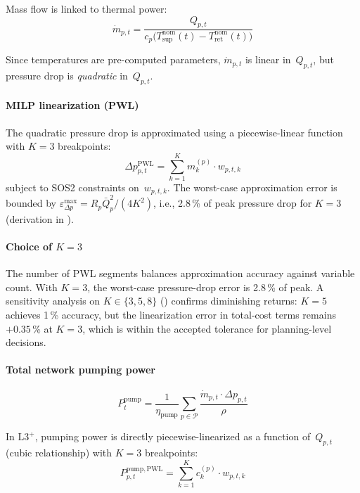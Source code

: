 \documentclass[review,3p]{elsarticle}
\newcommand{\Lplus}{\mathrm{L3}^{+}}
\begin{document}
Mass flow is linked to thermal power:
\begin{equation}
  \dot{m}_{p,t} = \frac{Q_{p,t}}{c_p \bigl(
    T_{\mathrm{sup}}^{\mathrm{nom}}(t)
    - T_{\mathrm{ret}}^{\mathrm{nom}}(t)\bigr)}
  \label{eq:massflow}
\end{equation}

Since temperatures are pre-computed parameters, $\dot{m}_{p,t}$ is
linear in~$Q_{p,t}$, but pressure drop is \emph{quadratic}
in~$Q_{p,t}$.

\paragraph{MILP linearization (PWL)}
The quadratic pressure drop is approximated using a piecewise-linear
function with $K=3$ breakpoints:
\begin{equation}
  \Delta p_{p,t}^{\mathrm{PWL}} = \sum_{k=1}^{K}
    m_k^{(p)} \cdot w_{p,t,k}
  \label{eq:pressure_pwl}
\end{equation}
subject to SOS2 constraints on~$w_{p,t,k}$. The worst-case
approximation error is bounded by
$\varepsilon_{\Delta p}^{\max} = R_p \bar{Q}_p^2 / (4K^2)$, i.e.,
2.8\,\% of peak pressure drop for $K=3$ (derivation in
).

\paragraph{Choice of $K=3$}
The number of PWL segments balances approximation accuracy against
variable count. With $K=3$, the worst-case pressure-drop error is
2.8\,\% of peak. A sensitivity analysis on $K \in \{3, 5, 8\}$
() confirms diminishing returns: $K=5$ achieves 1\,\%
accuracy, but the linearization error in total-cost terms remains
$+0.35$\,\% at $K=3$, which is within the accepted tolerance for
planning-level decisions.

\paragraph{Total network pumping power}
\begin{equation}
  P_t^{\mathrm{pump}} = \frac{1}{\eta_{\mathrm{pump}}}
    \sum_{p \in \mathcal{P}}
    \frac{\dot{m}_{p,t} \cdot \Delta p_{p,t}}{\rho}
  \label{eq:pump_power}
\end{equation}

In $\Lplus$, pumping power is directly piecewise-linearized as a
function of~$Q_{p,t}$ (cubic relationship) with $K=3$ breakpoints:
\begin{equation}
  P_{p,t}^{\mathrm{pump,PWL}} = \sum_{k=1}^{K}
    c_k^{(p)} \cdot w_{p,t,k}
  \label{eq:pump_pwl}
\end{equation}
\end{document}
